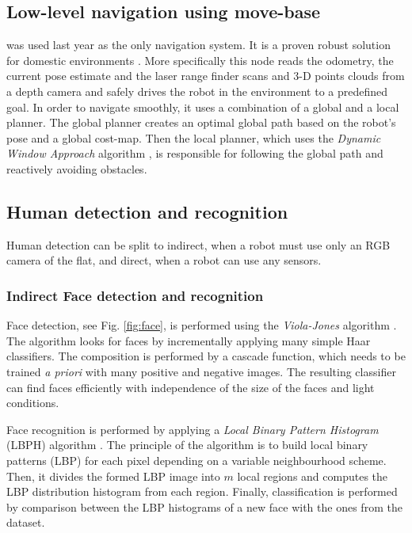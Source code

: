 \subsection{Low-level navigation using move-base} was used last year as the only navigation system. It is a proven robust solution for domestic environments \cite{Marder-Eppstein2010}. More specifically this node reads the odometry, the current pose estimate and the laser range finder scans and 3-D points clouds from a depth camera and safely drives the robot in the environment to a predefined goal. In order to navigate smoothly, it uses a combination of a global and a local planner. The global planner creates an optimal global path based on the robot's pose and a global cost-map. Then the local planner, which uses the \textit{Dynamic Window Approach} algorithm \cite{dwa}, is responsible for following the global path and reactively avoiding obstacles. 



\subsection{Human detection and recognition}

Human detection can be split to indirect, when a robot must use only an RGB camera of the flat, and direct, when a robot can use any sensors. 

\subsubsection{\label{sec:vision}Indirect Face detection and recognition}

Face detection, see Fig. \ref{fig:face}, is performed using the \textit{Viola-Jones} algorithm \cite{Viola01_RapidObjDet}. The algorithm looks for faces by incrementally applying many simple Haar classifiers. The composition is performed by a cascade function, which needs to be trained \textit{a priori} with many positive and negative images. The resulting classifier can find faces efficiently with independence of the size of the faces and light conditions.

Face recognition is performed by applying a \textit{Local Binary Pattern Histogram} (LBPH) algorithm \cite{Ahonen04_FaceRecLBP}. The principle of the algorithm is to build local binary patterns (LBP) for each pixel depending on a variable neighbourhood scheme. Then, it divides the formed LBP image into $m$ local regions and computes the LBP distribution histogram from each region. Finally, classification is performed by comparison between the LBP histograms of a new face with the ones from the dataset.


